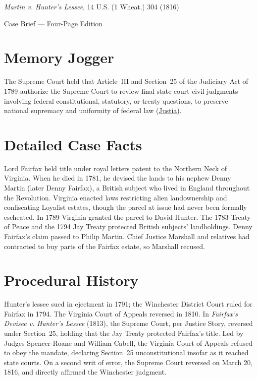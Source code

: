 \documentclass[12pt]{article}
\begin{document}
\begin{center}
{\LARGE \textit{Martin v. Hunter's Lessee}, 14 U.S. (1 Wheat.) 304 (1816)\par}
\vspace{0.8em}
{\large Case Brief --- Four-Page Edition\par}
\end{center}
\vspace{1em}

\section{Memory Jogger}

The Supreme Court held that Article~III and Section~25 of the Judiciary Act of 1789 authorize the Supreme Court to review final state-court civil judgments involving federal constitutional, statutory, or treaty questions, to preserve national supremacy and uniformity of federal law (\href{https://supreme.justia.com/cases/federal/us/14/304/}{Justia}).

\section{Detailed Case Facts}

Lord Fairfax held title under royal letters patent to the Northern Neck of Virginia. When he died in 1781, he devised the lands to his nephew Denny Martin (later Denny Fairfax), a British subject who lived in England throughout the Revolution. Virginia enacted laws restricting alien landownership and confiscating Loyalist estates, though the parcel at issue had never been formally escheated. In 1789 Virginia granted the parcel to David Hunter. The 1783 Treaty of Peace and the 1794 Jay Treaty protected British subjects' landholdings. Denny Fairfax's claim passed to Philip Martin. Chief Justice Marshall and relatives had contracted to buy parts of the Fairfax estate, so Marshall recused.

\section{Procedural History}

Hunter's lessee sued in ejectment in 1791; the Winchester District Court ruled for Fairfax in 1794. The Virginia Court of Appeals reversed in 1810. In \textit{Fairfax's Devisee v. Hunter's Lessee} (1813), the Supreme Court, per Justice Story, reversed under Section~25, holding that the Jay Treaty protected Fairfax's title. Led by Judges Spencer Roane and William Cabell, the Virginia Court of Appeals refused to obey the mandate, declaring Section~25 unconstitutional insofar as it reached state courts. On a second writ of error, the Supreme Court reversed on March 20, 1816, and directly affirmed the Winchester judgment.
\end{document}
